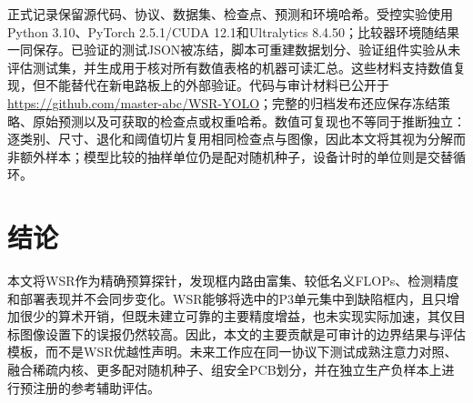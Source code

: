 \documentclass[conference]{IEEEtran}
\begin{document}
正式记录保留源代码、协议、数据集、检查点、预测和环境哈希。受控实验使用Python 3.10、PyTorch 2.5.1/CUDA 12.1和Ultralytics 8.4.50；比较器环境随结果一同保存。已验证的测试JSON被冻结，脚本可重建数据划分、验证组件实验从未评估测试集，并生成用于核对所有数值表格的机器可读汇总。这些材料支持数值复现，但不能替代在新电路板上的外部验证。代码与审计材料已公开于\url{https://github.com/master-abc/WSR-YOLO}；完整的归档发布还应保存冻结策略、原始预测以及可获取的检查点或权重哈希。数值可复现也不等同于推断独立：逐类别、尺寸、退化和阈值切片复用相同检查点与图像，因此本文将其视为分解而非额外样本；模型比较的抽样单位仍是配对随机种子，设备计时的单位则是交替循环。

\section{结论}
本文将WSR作为精确预算探针，发现框内路由富集、较低名义FLOPs、检测精度和部署表现并不会同步变化。WSR能够将选中的P3单元集中到缺陷框内，且只增加很少的算术开销，但既未建立可靠的主要精度增益，也未实现实际加速，其仅目标图像设置下的误报仍然较高。因此，本文的主要贡献是可审计的边界结果与评估模板，而不是WSR优越性声明。未来工作应在同一协议下测试成熟注意力对照、融合稀疏内核、更多配对随机种子、组安全PCB划分，并在独立生产负样本上进行预注册的参考辅助评估。
\end{document}
